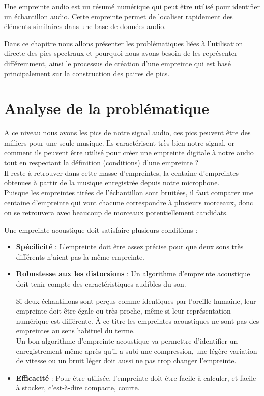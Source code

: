 \documentclass[11pt, report, french]{scrreprt}
\begin{document}
Une empreinte audio est un résumé numérique qui peut être utilisé pour identifier un échantillon audio. Cette empreinte permet de localiser rapidement des éléments similaires dans une base de données audio.\\\par

Dans ce chapitre nous allons présenter les problématiques liées à l'utilisation directe des pics spectraux et pourquoi nous avons besoin de les représenter différemment, ainsi le processus de création d'une empreinte qui est basé principalement sur la construction des paires de pics.\\

\section{Analyse de la problématique}

A ce niveau nous avons les pics de notre signal audio, ces pics peuvent être des milliers pour une seule musique. Ils caractérisent très bien notre signal, or comment ils peuvent être utilisé pour créer une empreinte digitale à notre audio tout en respectant la définition (conditions) d'une empreinte ? \\

Il reste à retrouver dans cette masse d’empreintes, la centaine d’empreintes obtenues à partir de la musique enregistrée depuis notre microphone.\\
Puisque les empreintes tirées de l’échantillon sont bruitées, il faut comparer une centaine d’empreinte qui vont chacune correspondre à plusieurs morceaux, donc on se retrouvera avec beaucoup de morceaux potentiellement candidats.\\\par

Une empreinte acoustique doit satisfaire plusieurs conditions :\\

\begin{itemize}
	\item \textbf{Spécificité} : L'empreinte doit être assez précise pour que deux sons très différents n'aient pas la même empreinte.
	\item \textbf{Robustesse aux les distorsions} : Un algorithme d'empreinte acoustique doit tenir compte des caractéristiques audibles du son.\par
	Si deux échantillons sont perçus comme identiques par l'oreille humaine, leur empreinte doit être égale ou très proche, même si leur représentation numérique est différente. À ce titre les empreintes acoustiques ne sont pas des empreintes au sens habituel du terme.\\
	Un bon algorithme d'empreinte acoustique va permettre d'identifier un enregistrement même après qu'il a subi une compression, une légère variation de vitesse ou un bruit léger doit aussi ne pas trop changer l'empreinte.
	\item \textbf{Efficacité} : Pour être utilisée, l'empreinte doit être facile à calculer, et facile à stocker, c'est-à-dire compacte, courte.\\
\end{itemize}
\end{document}
